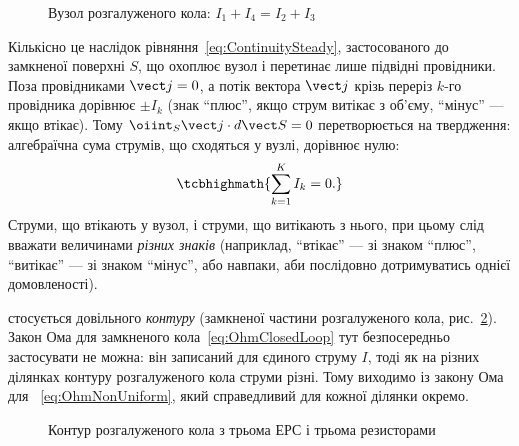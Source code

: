 \begin{figure}\centering
	\caption{Вузол розгалуженого кола: $I_1 + I_4 = I_2 + I_3$\label{pic:Nodes}}
\end{figure}

Кількісно це наслідок рівняння~\eqref{eq:ContinuitySteady}, застосованого до замкненої поверхні $S$, що охоплює вузол і перетинає лише підвідні
провідники. Поза провідниками $\vect j = 0$, а потік вектора $\vect j$ крізь переріз $k$-го провідника дорівнює $\pm I_k$ (знак \enquote{плюс}, якщо
струм витікає з об'єму, \enquote{мінус} --- якщо втікає). Тому $\oiint_S \vect j\cdot d\vect S = 0$ перетворюється на твердження: алгебраїчна сума
струмів, що сходяться у вузлі, дорівнює нулю:
\begin{equation}\label{eq:Kirchhoff1}
	\tcbhighmath{
		\sum\limits_{k=1}^K I_k = 0.
	}
\end{equation}
Струми, що втікають у вузол, і струми, що витікають з нього, при цьому слід вважати величинами \emph{різних знаків} (наприклад, \enquote{втікає} --- зі
знаком \enquote{плюс}, \enquote{витікає} --- зі знаком \enquote{мінус}, або навпаки, аби послідовно дотримуватись однієї домовленості).


 стосується довільного \emph{контуру} (замкненої частини розгалуженого кола, рис.~\ref{pic:Loop}). Закон Ома для
замкненого кола~\eqref{eq:OhmClosedLoop} тут безпосередньо застосувати не можна: він записаний для єдиного струму $I$, тоді як на різних ділянках
контуру розгалуженого кола струми різні. Тому виходимо із закону Ома для ~\eqref{eq:OhmNonUniform}, який справедливий
для кожної ділянки окремо.

\begin{figure}\centering
	\caption{Контур розгалуженого кола з трьома ЕРС і трьома резисторами\label{pic:Loop}}
\end{figure}

